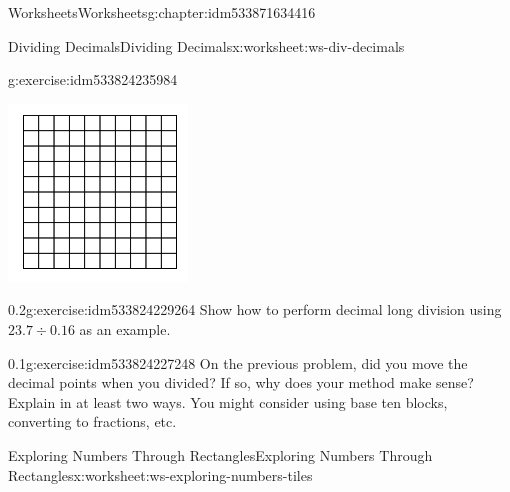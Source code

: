 \documentclass[twoside,11pt,]{book}
\begin{document}
\begin{chapterptx}{Worksheets}{}{Worksheets}{}{}{g:chapter:idm533871634416}
\begin{worksheet-section-numberless}{Dividing Decimals}{}{Dividing Decimals}{}{}{x:worksheet:ws-div-decimals}
\begin{divisionexercise}{2}{}{}{g:exercise:idm533824235984}
\begin{enumerate}[label=(\alph*)]
\begin{sidebyside}{1}{0.3}{0.3}{0}
\begin{sbspanel}{0.4}
\includegraphics[width=1\linewidth]{images/decimal-square.png}
\end{sbspanel}%
\end{sidebyside}%
%
\end{enumerate}
\end{divisionexercise}%
\begin{divisionexercise}{3}{}{0.2}{g:exercise:idm533824229264}%
Show how to perform decimal long division using \(23.7 \div 0.16 \) as an example.%
\end{divisionexercise}%
\clearpage
\begin{divisionexercise}{4}{}{0.1}{g:exercise:idm533824227248}%
On the previous problem, did you move the decimal points when you divided? If so, why does your method make sense?  Explain in at least two ways. You might consider using base ten blocks, converting to fractions, etc.%
\end{divisionexercise}%
\end{worksheet-section-numberless}
\restoregeometry
%
%
\typeout{************************************************}
\typeout{************************************************}
%
\begin{worksheet-section-numberless}{Exploring Numbers Through Rectangles}{}{Exploring Numbers Through Rectangles}{}{}{x:worksheet:ws-exploring-numbers-tiles}

\end{worksheet-section-numberless}
\end{chapterptx}
\end{document}
